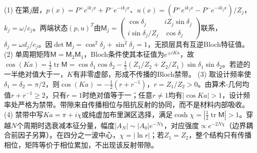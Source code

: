 (1) 在第\(j\)层，\(p(x)=P^+e^{ik_jx}+P^-e^{-ik_jx}\)、\(u(x)=(P^+e^{ik_jx}-P^-e^{-ik_jx})/Z_j\)，\(k_j=\omega/c_j\)。两端状态\((p,u)^T\)由\(\mathsf M_j=\begin{pmatrix}\cos\delta_j&iZ_j\sin\delta_j\\i\sin\delta_j/Z_j&\cos\delta_j\end{pmatrix}\)联系，\(\delta_j=\omega d_j/c_j\)。因\(\det\mathsf M_j=\cos^2\delta_j+\sin^2\delta_j=1\)，无损层具有互逆Bloch特征值。
(2) 单周期矩阵\(\mathsf M=\mathsf M_2\mathsf M_1\)，Bloch条件使其本征值为\(e^{\pm iKa}\)，故\(\cos(Ka)=\tfrac12\operatorname{tr}\mathsf M=\cos\delta_1\cos\delta_2-\tfrac12(Z_1/Z_2+Z_2/Z_1)\sin\delta_1\sin\delta_2\)。若迹的一半绝对值大于一，\(K\)有非零虚部，形成不传播的Bloch禁带。
(3) 取设计频率使\(\delta_1=\delta_2=\pi/2\)，则\(\cos(Ka)=-\tfrac12(r+r^{-1})\)，\(r=Z_1/Z_2>0\)。由算术-几何均值\(r+r^{-1}\ge2\)，只有\(r=1\)时绝对值等于一；任意\(r\ne1\)均有\(|\cos Ka|>1\)，设计频率处严格为禁带。带隙来自传播相位与阻抗反射的协同，而不是材料内部吸收。
(4) 禁带中写\(Ka=\pi+i\chi\)或纯虚加布里渊区选择，满足\(\cosh\chi=|\tfrac12\operatorname{tr}\mathsf M|>1\)。穿越\(N\)个周期时选衰减本征分量，幅度\(|A_N|\sim |A_0|e^{-N\chi}\)，对应强度\(\propto e^{-2N\chi}\)（边界耦合前因子另算）。在四分之一波中心，\(\chi=|\ln r|\)；若\(Z_1=Z_2\)，整个结构只有传播相位，矩阵等价于相位累加，不出现该反射带隙。
